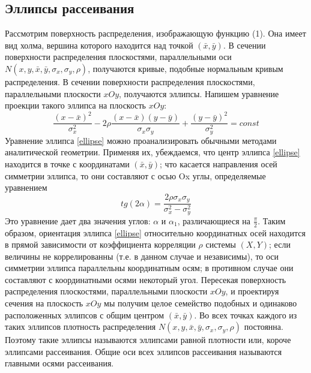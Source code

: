 \documentclass[a4paper]{article}
\begin{document}
\subsection{Эллипсы рассеивания}
\noindent Рассмотрим поверхность распределения, изображающую функцию (1). Она имеет вид холма, вершина которого находится над точкой $(\bar{x},\bar{y})$.
\newline
В сечении поверхности распределения плоскостями, параллельными оси $ N(x, y, \bar{x}, \bar{y}, \sigma_{x}, \sigma_{y}, \rho)$, получаются кривые, подобные нормальным кривым распределения. В сечении поверхности распределения плоскостями, параллельными плоскости $xOy$, получаются эллипсы. Напишем уравнение проекции такого эллипса на плоскость $xOy$: 
\begin{equation}
\frac{(x-\bar{x})^{2}}{\sigma_{x}^{2}} - 
2\rho\frac{(x-\bar{x})(y-\bar{y})}{\sigma_{x}\sigma_{y}}+
\frac{(y-\bar{y})^{2}}{\sigma_{y}^{2}} = const
\label{ellipse}
\end{equation}
Уравнение эллипса \ref{ellipse} можно проанализировать обычными методами аналитической геометрии. Применяя их, убеждаемся, что центр эллипса \ref{ellipse} находится в точке с координатами $(\bar{x},\bar{y})$; что касается направления осей симметрии эллипса, то они составляют с осью Ox углы, определяемые уравнением
\begin{equation}
tg(2\alpha) = \frac{2\rho\sigma_{x}\sigma_{y}}{\sigma_{x}^{2} - \sigma_{y}^{2}}
\label{angle}
\end{equation}
Это уравнение дает два значения углов: $\alpha$ и $\alpha_{1}$, различающиеся на $\frac{\pi}{2}$.
\newline
Таким образом, ориентация эллипса \ref{ellipse} относительно координатных осей находится в прямой зависимости от коэффициента корреляции $\rho$ системы $(X,Y)$; если величины не коррелированны (т.е. в данном случае и независимы), то оси симметрии эллипса параллельны координатным осям; в противном случае они составляют с координатными осями некоторый угол.
\newline
Пересекая поверхность распределения плоскостями, параллельными плоскости $xOy$, и проектируя сечения на плоскость $xOy$ мы получим целое семейство подобных и одинаково расположенных эллипсов с общим центром $(\bar{x},\bar{y})$. Во всех точках каждого из таких эллипсов плотность распределения $ N(x, y, \bar{x}, \bar{y}, \sigma_{x}, \sigma_{y}, \rho)$ постоянна. Поэтому такие эллипсы называются эллипсами равной плотности или, короче эллипсами рассеивания. Общие оси всех эллипсов рассеивания называются главными осями рассеивания.
\end{document}
